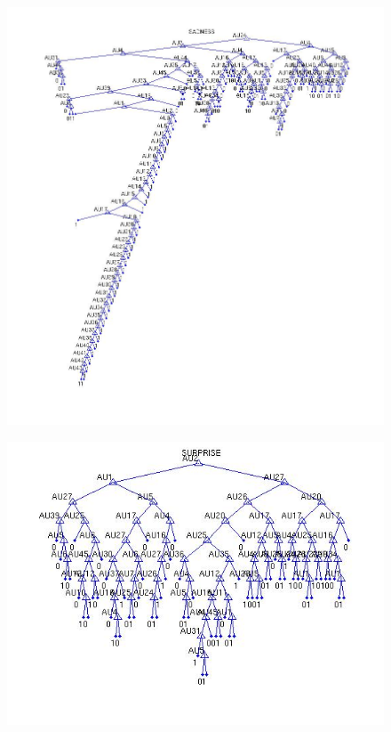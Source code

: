 \documentclass[11pt]{amsart}
\begin{document}
\begin{figure}[!h]
\includegraphics[scale=0.6]{sadness.jpg}
\end{figure}

\begin{figure}[!h]
\includegraphics[scale=0.6]{surprise.jpg}
\end{figure}
\clearpage
\end{document}
